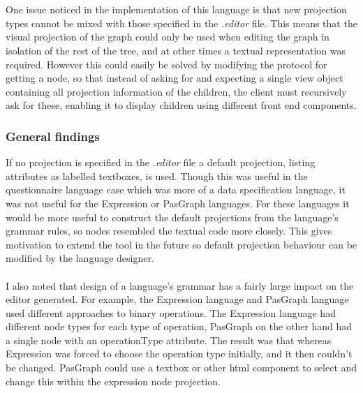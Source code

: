 \documentclass{article}
\begin{document}
\\
\\
One issue noticed in the implementation of this language is that new projection types cannot be mixed with those specified in the \emph{.editor} file. This means that the visual projection of the graph could only be used when editing the graph in isolation of the rest of the tree, and at other times a textual representation was required. However this could easily be solved by modifying the protocol for getting a node, so that instead of asking for and expecting a single view object containing all projection information of the children, the client must recursively ask for these, enabling it to display children using different front end components.
%
%

\subsubsection{General findings}
If no projection is specified in the \emph{.editor} file a default projection, listing attributes as labelled textboxes, is used. Though this was useful in the questionnaire language case which was more of a data specification language, it was not useful for the Expression or PasGraph languages. For these languages it would be more useful to construct the default projections from the language's grammar rules, so nodes resembled the textual code more closely. This gives motivation to extend the tool in the future so default projection behaviour can be modified by the language designer.
\\
\\
I also noted that design of a language's grammar has a fairly large impact on the editor generated. For example, the Expression language and PasGraph language used different approaches to binary operations. The Expression language had different node types for each type of operation, PasGraph on the other hand had a single node with an operationType attribute. The result was that whereas Expression was forced to choose the operation type initially, and it  then couldn't be changed. PasGraph could use a textbox or other html component to select and change this within the expression node projection. 
\end{document}
